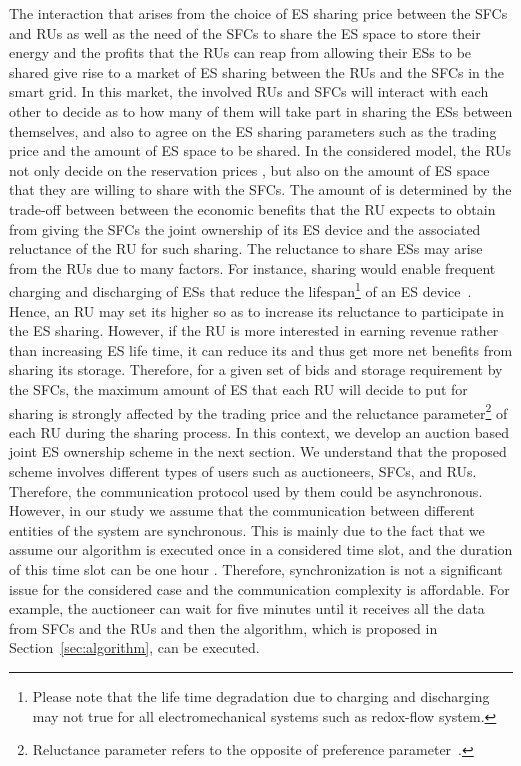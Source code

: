 \documentclass[journal,10pt]{IEEEtran}
\begin{document}
The interaction that arises from the choice of ES sharing price between the SFCs and RUs as well as the need of the SFCs to share the ES space to store their energy and the profits that the RUs can reap from allowing their ESs to be shared give rise to a market of ES sharing between the RUs and the SFCs in the smart grid. In this market, the involved  RUs and  SFCs will interact with each other to decide as to how many of them will take part in sharing the ESs between themselves, and also to agree on the ES sharing parameters such as the trading price  and the amount of ES space to be shared. In the considered model, the RUs not only decide on the reservation prices , but also on the amount of ES space  that they are willing to share with the SFCs. The amount of  is determined by the trade-off between between the economic benefits that the RU  expects to obtain from giving the SFCs the joint ownership of its ES device and the associated reluctance  of the RU for such sharing. The reluctance to share ESs may arise from the RUs due to many factors. For instance, sharing would enable frequent charging and discharging of ESs that reduce the lifespan\footnote{Please note that the life time degradation due to charging and discharging may not true for all electromechanical systems such as redox-flow system.} of an ES device~\cite{Bradley-RSER:2009}. Hence, an RU  may set its  higher so as to increase its reluctance to participate in the ES sharing. However, if the RU is more interested in earning revenue rather than increasing ES life time, it can reduce its  and thus get more net benefits from sharing its storage. Therefore, for a given set of bids  and storage requirement  by the SFCs, the maximum amount of ES  that each RU  will decide to put for sharing is strongly affected by the trading price  and the reluctance parameter\footnote{Reluctance parameter refers to the opposite of preference parameter~\cite{Wayes-J-TSG:2012}.}  of each RU  during the sharing process. In this context, we develop an auction based joint ES ownership scheme in the next section. We understand that the proposed scheme involves different types of users such as auctioneers, SFCs, and RUs. Therefore, the communication protocol used by them could be asynchronous. However, in our study we assume that the communication between different entities of the system are synchronous. This is mainly due to the fact that we assume our algorithm is executed once in a considered time slot, and the duration of this time slot can be one hour \cite{Derin:2010}. Therefore, synchronization is not a significant issue for the considered case and the communication complexity is affordable. For example, the auctioneer can wait for five minutes until it receives all the data from SFCs and the RUs and then the algorithm, which is proposed in Section~\ref{sec:algorithm}, can be executed.
\end{document}

